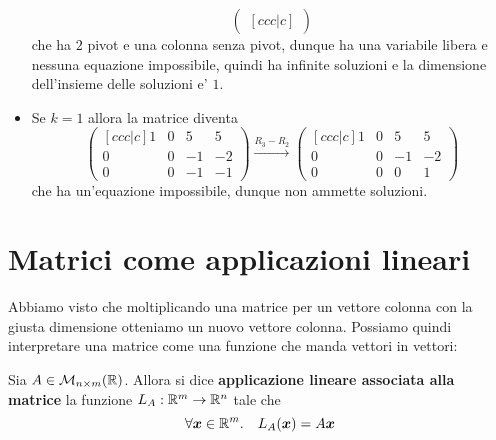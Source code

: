 \begin{solution}
\begin{itemize}
\[\begin{pmatrix}[ccc|c]
            \end{pmatrix}    
        \] che ha $2$ pivot e una colonna senza pivot, dunque ha una variabile libera e nessuna equazione impossibile, quindi ha infinite soluzioni e la dimensione dell'insieme delle soluzioni e' $1$.
        \item Se $k = 1$ allora la matrice diventa \[
            \begin{pmatrix}[ccc|c]
                1&0&5&5\\0&0&-1&-2\\0&0&-1&-1
            \end{pmatrix} \xrightarrow[]{R_3-R_2} 
            \begin{pmatrix}[ccc|c]
                1&0&5&5\\0&0&-1&-2\\0&0&0&1
            \end{pmatrix}
        \] che ha un'equazione impossibile, dunque non ammette soluzioni.
    \end{itemize}
\end{solution}

\section{Matrici come applicazioni lineari}

Abbiamo visto che moltiplicando una matrice per un vettore colonna con la giusta dimensione otteniamo un nuovo vettore colonna. Possiamo quindi interpretare una matrice come una funzione che manda vettori in vettori:
\begin{definition}
    Sia $A \in \mathcal{M}_{n \times m}(\mathbb{R})$. Allora si dice \textbf{applicazione lineare associata alla matrice} la funzione $L_A : \mathbb{R}^m \to \mathbb{R}^n$ tale che \begin{equation}
        \forall \bm{x} \in \mathbb{R}^m. \quad L_A(\bm{x}) = A \bm{x}
    \end{equation}
\end{definition}

